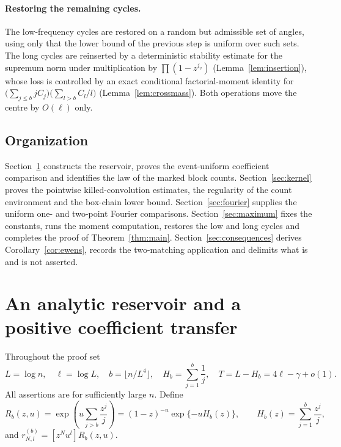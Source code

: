 \documentclass[11pt]{article}
\theoremstyle{definition}\newtheorem{definition}[theorem]{Definition}
\theoremstyle{remark}\newtheorem{remark}[theorem]{Remark}
\numberwithin{equation}{section}\allowdisplaybreaks
\begin{document}
\paragraph{Restoring the remaining cycles.} The low-frequency cycles are
restored on a random but admissible set of angles, using only that the
lower bound of the previous step is uniform over such sets. The long
cycles are reinserted by a deterministic stability estimate for the
supremum norm under multiplication by $\prod(1-z^{j_v})$
(Lemma~\ref{lem:insertion}), whose loss is controlled by an exact
conditional factorial-moment identity for
$\bigl(\sum_{j\le b}jC_j\bigr)\bigl(\sum_{l>b}C_l/l\bigr)$
(Lemma~\ref{lem:crossmass}). Both operations move the centre by $O(\ell)$
only.

\subsection{Organization}\label{subsec:organization}

Section~\ref{sec:reservoir} constructs the reservoir, proves the
event-uniform coefficient comparison and identifies the law of the
marked block counts. Section~\ref{sec:kernel} proves the pointwise
killed-convolution estimates, the regularity of the count environment
and the box-chain lower bound. Section~\ref{sec:fourier} supplies the
uniform one- and two-point Fourier comparisons. Section~\ref{sec:maximum}
fixes the constants, runs the moment computation, restores the low and
long cycles and completes the proof of Theorem~\ref{thm:main}.
Section~\ref{sec:consequences} derives Corollary~\ref{cor:ewens}, records
the two-matching application and delimits what is and is not asserted.

\section{An analytic reservoir and a positive coefficient transfer}
\label{sec:reservoir}
Throughout the proof set
\begin{equation}\label{eq:parameters}
 L=\log n,\quad \ell=\log L,\quad b=\lfloor n/L^4\rfloor,
 \quad H_b=\sum_{j=1}^b\frac1j,\quad T=L-H_b=4\ell-\gamma+o(1).
\end{equation}
All assertions are for sufficiently large $n$. Define
\begin{equation}\label{eq:reservoir}
 R_b(z,u)=\exp\left(u\sum_{j>b}\frac{z^j}{j}\right)
 =(1-z)^{-u}\exp\{-uH_b(z)\},\qquad
 H_b(z)=\sum_{j=1}^b\frac{z^j}{j},
\end{equation}
and $r_{N,l}^{(b)}=[z^Nu^l]R_b(z,u)$.
\end{document}

